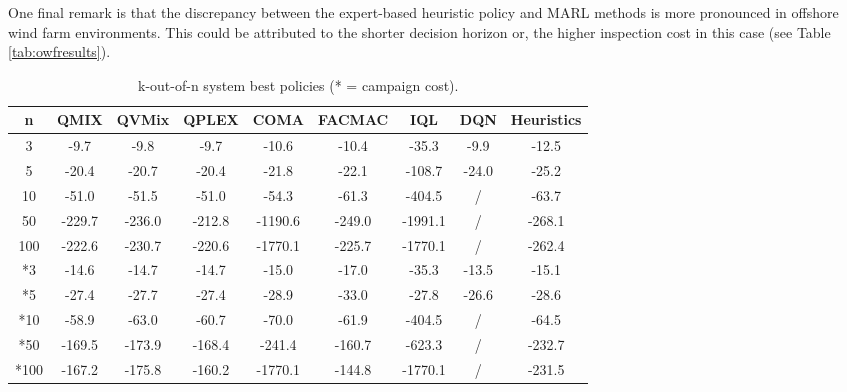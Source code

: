 One final remark is that the discrepancy between the expert-based heuristic policy and MARL methods is more pronounced in offshore wind farm environments. 
This could be attributed to the shorter decision horizon or, the higher inspection cost in this case (see Table \ref{tab:owfresults}).

\newpage
\begin{table}
\centering
\setlength\tabcolsep{4.5pt}
\begin{tabular}{c|ccccccc|c}
\toprule
n & QMIX & QVMix & QPLEX & COMA & FACMAC & IQL & DQN & Heuristics \\
\midrule
3 & -9.7 & -9.8 & -9.7 & -10.6 & -10.4 & -35.3 & -9.9 & -12.5 \\
5 & -20.4 & -20.7 & -20.4 & -21.8 & -22.1 & -108.7 & -24.0 & -25.2 \\
10 & -51.0 & -51.5 & -51.0 & -54.3 & -61.3 & -404.5 & / & -63.7 \\
50 & -229.7 & -236.0 & -212.8 & -1190.6 & -249.0 & -1991.1 & / & -268.1 \\
100 & -222.6 & -230.7 & -220.6 & -1770.1 & -225.7 & -1770.1 & / & -262.4 \\
\midrule
*3 & -14.6 & -14.7 & -14.7 & -15.0 & -17.0 & -35.3 & -13.5 & -15.1 \\
*5 & -27.4 & -27.7 & -27.4 & -28.9 & -33.0 & -27.8 & -26.6 & -28.6 \\
*10 & -58.9 & -63.0 & -60.7 & -70.0 & -61.9 & -404.5 & / & -64.5 \\
*50 & -169.5 & -173.9 & -168.4 & -241.4 & -160.7 & -623.3 & / & -232.7 \\
*100 & -167.2 & -175.8 & -160.2 & -1770.1 & -144.8 & -1770.1 & / & -231.5 \\
\bottomrule
\end{tabular}
\caption{k-out-of-n system best policies (* = campaign cost).}
\label{tab:koutofnresults}
\end{table}



